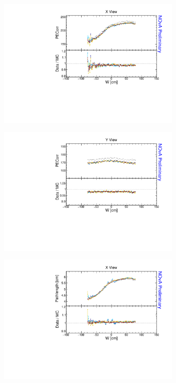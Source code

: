 \begin{figure}[!ht]
\begin{subfigure}{0.5\textwidth}
  \end{subfigure}
  \begin{subfigure}{0.5\textwidth}
    \includegraphics[width=\linewidth]{essentialsec_tb/pecorr_w_x.pdf}
  \end{subfigure}
  \begin{subfigure}{0.5\textwidth}
    \includegraphics[width=\linewidth]{essentialsec_tb/pecorr_w_y.pdf}
  \end{subfigure}
  \begin{subfigure}{0.5\textwidth}
    \includegraphics[width=\linewidth]{essentialsec_tb/cm_w_x.pdf}

\end{subfigure}
\end{figure}
